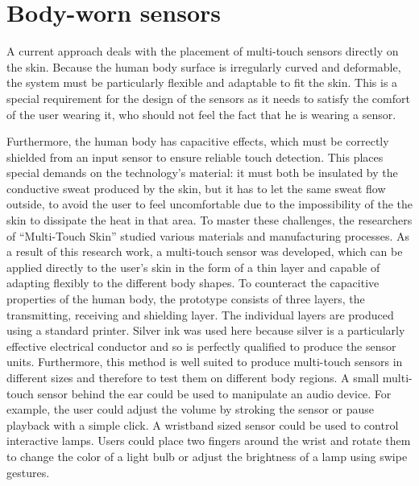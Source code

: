\documentclass{sigchi}
\begin{document}
\section{Body-worn sensors}
A current approach deals with the placement of multi-touch sensors directly on the skin. Because the human body surface is irregularly curved and deformable, the system must be particularly flexible and adaptable to fit the skin. This is a special requirement for the design of the sensors as it needs to satisfy the comfort of the user wearing it, who should not feel the fact that he is wearing a sensor. \cite{ulbrich2,iSkin}%

Furthermore, the human body has capacitive effects, which must be correctly shielded from an input sensor to ensure reliable touch detection. This places special demands on the technology's material: it must both be insulated by the conductive sweat produced by the skin, but it has to let the same sweat flow outside, to avoid the user to feel uncomfortable due to the impossibility of the the skin to dissipate the heat in that area. \cite{ulbrich2} %
To master these challenges, the researchers of “Multi-Touch Skin” \cite{ulbrich2} studied various materials and manufacturing processes. As a result of this research work, a multi-touch sensor was developed, which can be applied directly to the user's skin in the form of a thin layer and capable of adapting flexibly to the different body shapes. To counteract the capacitive properties of the human body, the prototype consists of three layers, the transmitting, receiving and shielding layer. The individual layers are produced using a standard printer. Silver ink was used here because silver is a particularly effective electrical conductor and so is perfectly qualified to produce the sensor units. Furthermore, this method is well suited to produce multi-touch sensors in different sizes and therefore to test them on different body regions. \cite{ulbrich2}
A small multi-touch sensor behind the ear could be used to manipulate an audio device. For example, the user could adjust the volume by stroking the sensor or pause playback with a simple click. A wristband sized sensor could be used to control interactive lamps. Users could place two fingers around the wrist and rotate them to change the color of a light bulb or adjust the brightness of a lamp using swipe gestures. \cite{ulbrich2}
\end{document}
